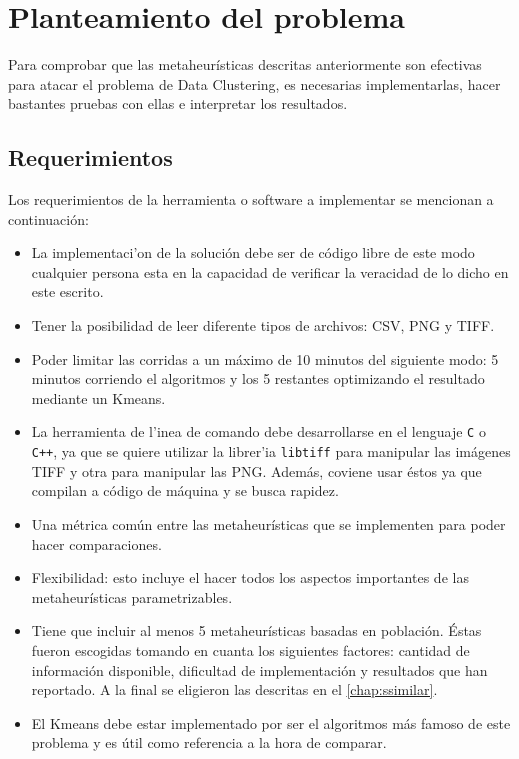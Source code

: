 \chapter{Planteamiento del problema} \label{chap:planning}

\vspace{5 mm}

Para comprobar que las metaheur\'isticas descritas anteriormente son 
efectivas para atacar el problema de Data Clustering, es necesarias implementarlas,
hacer bastantes pruebas con ellas e interpretar los resultados.

\section{Requerimientos} \label{sect:requirements}

Los requerimientos de la herramienta o software a implementar se mencionan a
continuaci\'on: 

\begin{itemize}
\item La implementaci'on de la soluci\'on 
debe ser de c\'odigo libre de este modo cualquier persona esta en la capacidad
de verificar la veracidad de lo dicho en este escrito.
\item Tener la posibilidad de leer diferente tipos de archivos: CSV, PNG y TIFF.
\item Poder limitar las corridas a un m\'aximo de 10 minutos del siguiente modo:
5 minutos corriendo el algoritmos y los 5 restantes optimizando el resultado
mediante un Kmeans.
\item La herramienta de l'inea de comando debe desarrollarse en el lenguaje
{\tt C} o {\tt C++}, ya que se quiere utilizar la librer'ia {\tt libtiff} para manipular
las im\'agenes TIFF y otra para manipular las PNG. Adem\'as, coviene
usar \'estos ya que compilan a c\'odigo de m\'aquina y se busca rapidez.
\item Una m\'etrica com\'un entre las metaheur\'isticas que se
implementen para poder hacer comparaciones.
\item Flexibilidad: esto incluye el hacer todos los aspectos
importantes de las metaheur\'isticas parametrizables.
\item Tiene que incluir al menos 5 metaheur\'isticas basadas en poblaci\'on.
\'Estas fueron escogidas tomando en cuanta los siguientes factores: cantidad de 
informaci\'on disponible, dificultad de implementaci\'on y resultados que han
reportado. A la final se eligieron las descritas en el \ref{chap:ssimilar}.
\item El Kmeans debe estar implementado por ser el algoritmos m\'as famoso
de este problema y es \'util como referencia a la hora de comparar.
\end{itemize}


